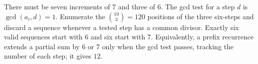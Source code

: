 There must be seven increments of 7 and three of 6. The gcd test for a step $d$ is $\gcd(a_i,d)=1$. Enumerate the $\binom{10}3=120$ positions of the three six-steps and discard a sequence whenever a tested step has a common divisor. Exactly six valid sequences start with 6 and six start with 7. Equivalently, a prefix recurrence extends a partial sum by 6 or 7 only when the gcd test passes, tracking the number of each step; it gives $\boxed{12}$.
